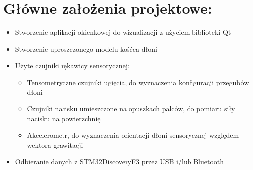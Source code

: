 \documentclass[12pt,a4paper]{article}
\begin{document}
\section{Główne założenia projektowe:}
\begin{itemize}
\item Stworzenie aplikacji okienkowej do wizualizacji z użyciem biblioteki Qt
\item Stworzenie uproszczonego modelu kośćca dłoni
\item Użyte czujniki rękawicy sensorycznej:
\begin{itemize}
\item Tensometryczne czujniki ugięcia, do wyznaczenia konfiguracji przegubów dłoni
\item Czujniki nacisku umieszczone na opuszkach palców, do pomiaru siły nacisku na powierzchnię
\item Akcelerometr, do wyznaczenia orientacji dłoni sensorycznej względem wektora grawitacji
\end{itemize}
\item Odbieranie danych z STM32DiscoveryF3 przez USB i/lub Bluetooth
\end{itemize}

\end{document}

